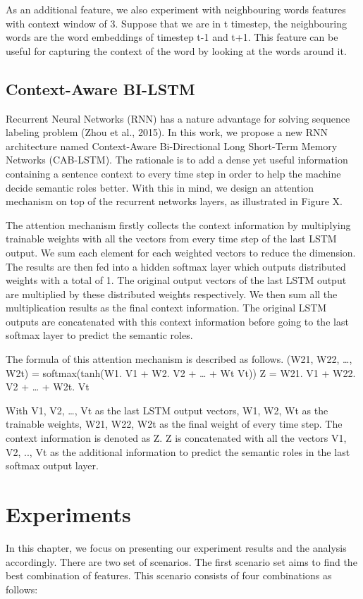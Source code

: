 As an additional feature, we also experiment with neighbouring words features with context window of 3. Suppose that we are in t timestep, the neighbouring words are the word embeddings of timestep t-1 and t+1. This feature can be useful for capturing the context of the word by looking at the words around it.

\subsection{Context-Aware BI-LSTM}
Recurrent Neural Networks (RNN) has a nature advantage for solving sequence labeling problem (Zhou et al., 2015). In this work, we propose a new RNN architecture named Context-Aware Bi-Directional Long Short-Term Memory Networks (CAB-LSTM). The rationale is to add a dense yet useful information containing a sentence context to every time step in order to help the machine decide semantic roles better. With this in mind, we design an attention mechanism on top of the recurrent networks layers, as illustrated in Figure X. 

The attention mechanism firstly collects the context information by multiplying trainable weights with all the vectors from every time step of the last LSTM output. We sum each element for each weighted vectors to reduce the dimension. The results are then fed into a hidden softmax layer which outputs distributed weights with a total of 1. The original output vectors of the last LSTM output are multiplied by these distributed weights respectively. We then sum all the multiplication results as the final context information. The original LSTM outputs are concatenated with this context information before going to the last softmax layer to predict the semantic roles.

The formula of this attention mechanism is described as follows.
(W21, W22, …, W2t) = softmax(tanh(W1. V1 + W2. V2 + … + Wt Vt))
Z = W21. V1 + W22. V2 + … + W2t. Vt

With V1, V2, …, Vt as the last LSTM output vectors, W1, W2, Wt as the trainable weights, W21, W22, W2t as the final weight of every time step. The context information is denoted as Z. Z is concatenated with all the vectors V1, V2, .., Vt as the additional information to predict the semantic roles in the last softmax output layer.

\section{Experiments}
In this chapter, we focus on presenting our experiment results and the analysis accordingly. There are two set of scenarios. The first scenario set aims to find the best combination of features. This scenario consists of four combinations as follows:

